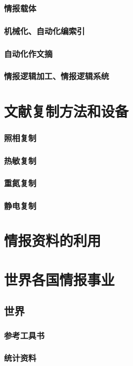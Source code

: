 \documentclass[UTF8]{../../ApplicationUniverse}
\begin{document}
    \subsubsection{情报载体}
    \subsubsection{机械化、自动化编索引}
    \subsubsection{自动化作文摘}
    \subsubsection{情报逻辑加工、情报逻辑系统}
\section{文献复制方法和设备}
    \subsubsection{照相复制}
    \subsubsection{热敏复制}
    \subsubsection{重氮复制}
    \subsubsection{静电复制}
\section{情报资料的利用}
\section{世界各国情报事业}
    \subsection{世界}
        \subsubsection{参考工具书}
        \subsubsection{统计资料}
\end{document}
